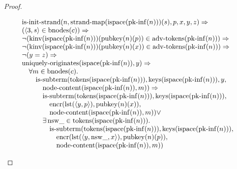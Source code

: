 \documentclass[11pt]{article}
\theoremstyle{plain}
\begin{document}
\begin{proof}
\begin{itemize}[leftmargin=2.8em, itemsep=4pt, parsep=1pt]
\begin{itemize}[leftmargin=2.8em, itemsep=4pt, parsep=1pt]
\begin{equation*}
\begin{array}{@{}l@{}}
\begin{array}{@{}l@{}} \operatorname{is\text{-}init\text{-}strand}(n, \operatorname{strand\text{-}map}(\operatorname{ispace}(\operatorname{pk\text{-}inf}(n)))(s), p, x, y, z) \Rightarrow  \\ (\langle 3, s \rangle \in \operatorname{bnodes}(c)) \Rightarrow  \\ \neg (\operatorname{kinv}(\operatorname{ispace}(\operatorname{pk\text{-}inf}(n)))(\operatorname{pubkey}(n)(p)) \in \operatorname{adv\text{-}tokens}(\operatorname{pk\text{-}inf}(n))) \Rightarrow  \\ \neg (\operatorname{kinv}(\operatorname{ispace}(\operatorname{pk\text{-}inf}(n)))(\operatorname{pubkey}(n)(x)) \in \operatorname{adv\text{-}tokens}(\operatorname{pk\text{-}inf}(n))) \Rightarrow  \\ \neg (y = z) \Rightarrow  \\ \operatorname{uniquely\text{-}originates}(\operatorname{ispace}(\operatorname{pk\text{-}inf}(n)), y) \Rightarrow  \\ \quad \forall m \in \operatorname{bnodes}(c). \\ \quad \quad \operatorname{is\text{-}subterm}(\operatorname{tokens}(\operatorname{ispace}(\operatorname{pk\text{-}inf}(n))), \operatorname{keys}(\operatorname{ispace}(\operatorname{pk\text{-}inf}(n))), y, \\ \quad \quad \quad \operatorname{node\text{-}content}(\operatorname{ispace}(\operatorname{pk\text{-}inf}(n)), m)) \Rightarrow \\ \quad \quad \quad \operatorname{is\text{-}subterm}(\operatorname{tokens}(\operatorname{ispace}(\operatorname{pk\text{-}inf}(n))), \operatorname{keys}(\operatorname{ispace}(\operatorname{pk\text{-}inf}(n))), \\ \quad \quad \quad \quad \operatorname{encr}(\operatorname{lst}(\langle y, p \rangle), \operatorname{pubkey}(n)(x)), \\ \quad \quad \quad \quad \operatorname{node\text{-}content}(\operatorname{ispace}(\operatorname{pk\text{-}inf}(n)), m)) \vee \\ \quad \quad \quad \exists \operatorname{nsw\_} \in \operatorname{tokens}(\operatorname{ispace}(\operatorname{pk\text{-}inf}(n))). \\ \quad \quad \quad \quad \operatorname{is\text{-}subterm}(\operatorname{tokens}(\operatorname{ispace}(\operatorname{pk\text{-}inf}(n))), \operatorname{keys}(\operatorname{ispace}(\operatorname{pk\text{-}inf}(n))), \\ \quad \quad \quad \quad \quad \operatorname{encr}(\operatorname{lst}(\langle y, \operatorname{nsw\_}, x \rangle), \operatorname{pubkey}(n)(p)), \\ \quad \quad \quad \quad \quad \operatorname{node\text{-}content}(\operatorname{ispace}(\operatorname{pk\text{-}inf}(n)), m)) \end{array} \\

\end{array}
\end{equation*}
\end{itemize}
\end{itemize}
\end{proof}
\end{document}
